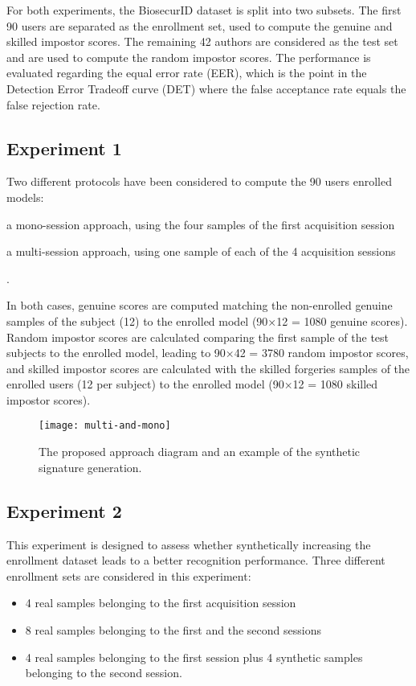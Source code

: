 For both experiments, the BiosecurID dataset is split into two subsets. The first 90 users are separated as the enrollment set, used to compute the genuine and skilled impostor scores. The remaining 42 authors are considered as the test set and are used to compute the random impostor scores. The performance is evaluated regarding the equal error rate (EER), which is the point in the Detection Error Tradeoff curve (DET) where the false acceptance rate equals the false rejection rate.

\subsection{Experiment 1}

Two different protocols have been considered to
compute the 90 users enrolled models:
\begin{inlinelist}
  \item a mono-session approach, using the four samples of the first acquisition session
  \item a multi-session approach, using one sample of each of the 4 acquisition sessions
\end{inlinelist}.

In both cases, genuine scores are computed matching the non-enrolled genuine samples of the subject (12) to the enrolled model (90×12 = 1080 genuine scores). Random impostor scores are calculated comparing the first sample of the test subjects to the
enrolled model, leading to 90×42 = 3780 random impostor scores, and skilled impostor scores are calculated with the skilled forgeries samples of the enrolled users
(12 per subject) to the enrolled model (90×12 = 1080 skilled impostor scores).

\begin{figure}[!htb]
\centering
\texttt{[image: multi-and-mono]}
\caption{The proposed approach diagram and an example of the synthetic signature generation.}
\label{fig:multiandmono}
\end{figure}

\subsection{Experiment 2}

This experiment is designed to assess whether synthetically increasing the enrollment dataset leads to a better recognition performance. Three different enrollment sets are considered in this experiment: 
\begin{itemize}
  \item 4 real samples belonging to the
  first acquisition session
  \item 8 real samples belonging to the first and
  the second sessions
  \item 4 real samples belonging
  to the first session plus 4 synthetic samples belonging
  to the second session.
\end{itemize}

